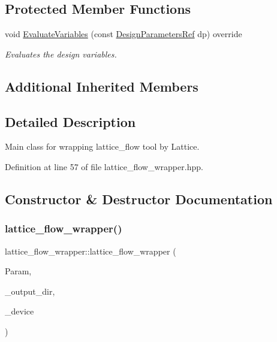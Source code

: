 \subsection*{Protected Member Functions}
\begin{DoxyCompactItemize}
\item 
void \hyperlink{classlattice__flow__wrapper_a731ddad3888b81665926537dfe415269}{Evaluate\+Variables} (const \hyperlink{DesignParameters_8hpp_ae36bb1c4c9150d0eeecfe1f96f42d157}{Design\+Parameters\+Ref} dp) override
\begin{DoxyCompactList}\small\item\em Evaluates the design variables. \end{DoxyCompactList}\end{DoxyCompactItemize}
\subsection*{Additional Inherited Members}


\subsection{Detailed Description}
Main class for wrapping lattice\+\_\+flow tool by Lattice. 

Definition at line 57 of file lattice\+\_\+flow\+\_\+wrapper.\+hpp.



\subsection{Constructor \& Destructor Documentation}
\mbox{\label{classlattice__flow__wrapper_a76ce7f3d8b84cbbf9cd7f092092276e6}} 
\subsubsection{\texorpdfstring{lattice\+\_\+flow\+\_\+wrapper()}{lattice\_flow\_wrapper()}}
{\footnotesize\ttfamily lattice\+\_\+flow\+\_\+wrapper\+::lattice\+\_\+flow\+\_\+wrapper (\begin{DoxyParamCaption}\item[{const \hyperlink{Parameter_8hpp_a37841774a6fcb479b597fdf8955eb4ea}{Parameter\+Const\+Ref} \&}]{Param,  }\item[{const std\+::string \&}]{\+\_\+output\+\_\+dir,  }\item[{const \hyperlink{target__device_8hpp_acedb2b7a617e27e6354a8049fee44eda}{target\+\_\+device\+Ref} \&}]{\+\_\+device }\end{DoxyParamCaption})}



